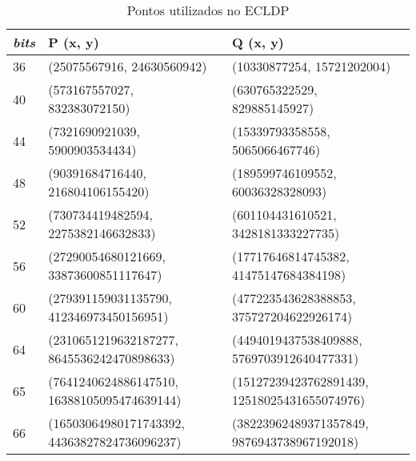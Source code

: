 \begin{anexosenv}
\begin{table}[h]
\centering
\caption{Pontos utilizados no ECLDP}
\label{table:ecldp_points}
\begin{tabular}{|p{1cm}|p{4.5cm}|p{4.5cm}|}
\hline
\multicolumn{1}{|c|}{\textit{bits}} & \textbf{P (x, y)} & \textbf{Q (x, y)} \\ \hline
36 & (25075567916, 24630560942) & (10330877254, 15721202004) \\ \hline
40 & (573167557027, 832383072150) & (630765322529, 829885145927) \\ \hline
44 & (7321690921039, 5900903534434) & (15339793358558, 5065066467746) \\ \hline
48 & (90391684716440, 216804106155420) & (189599746109552, 60036328328093) \\ \hline
52 & (730734419482594, 2275382146632833) & (601104431610521, 3428181333227735) \\ \hline
56 & (27290054680121669, 33873600851117647) & (17717646814745382, 41475147684384198) \\ \hline
60 & (279391159031135790, 412346973450156951) & (477223543628388853, 375727204622926174) \\ \hline
64 & (2310651219632187277, 8645536242470898633) & (4494019437538409888, 5769703912640477331) \\ \hline
65 & (7641240624886147510, 16388105095474639144) & (15127239423762891439, 12518025431655074976) \\ \hline
66 & (16503064980171743392, 44363827824736096237) & (38223962489371357849, 9876943738967192018) \\ \hline
\end{tabular}
\end{table}

\end{anexosenv}
